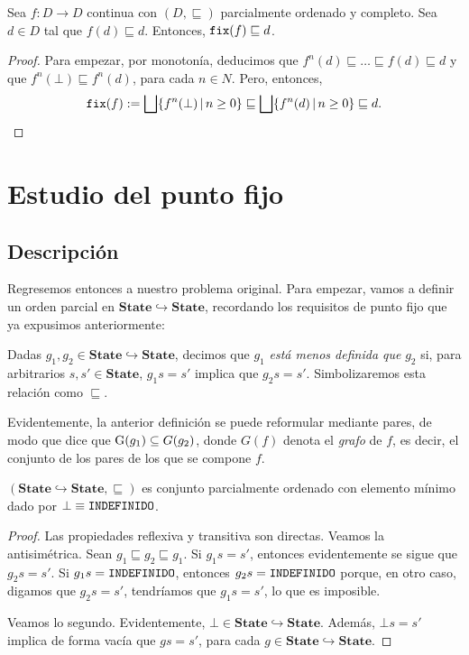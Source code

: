 \begin{prop}\label{propcpo}
Sea $f: D \to D$ continua con $(D, \sqsubseteq)$ parcialmente ordenado y completo. Sea $d \in D$ tal que $f(d)\sqsubseteq d$. Entonces, $\texttt{fix}(f) \sqsubseteq d$.
\end{prop}
\begin{proof}
Para empezar, por monotonía, deducimos que $f^n(d)\sqsubseteq \dots \sqsubseteq f(d) \sqsubseteq d$ y que $f^{n}(\bot) \sqsubseteq f^n(d)$, para cada $n \in N$. Pero, entonces, 
$$\texttt{fix}(f) := \bigsqcup\{f^n(\bot) \, | \, n \geq 0\} \sqsubseteq \bigsqcup\{f^n(d) \, | \, n \geq 0\} \sqsubseteq d.$$
\end{proof}


\section{Estudio del punto fijo}


\subsection{Descripción}

Regresemos entonces a nuestro problema original. Para empezar, vamos a definir un orden parcial en $\mathbf{State}\hookrightarrow \mathbf{State}$, recordando los requisitos de punto fijo que ya expusimos anteriormente:
\begin{definition}
Dadas $g_1, g_2 \in \mathbf{State}\hookrightarrow \mathbf{State}$, decimos que $g_1$ \textit{está menos definida que} $g_2$ si, para arbitrarios $s, s' \in \mathbf{State}$, $g_1 s = s'$ implica que $g_2 s = s'$. Simbolizaremos esta relación como $\sqsubseteq$. 
\end{definition}
Evidentemente, la anterior definición se puede reformular mediante pares, de modo que dice que $\mathrm{G}(g_1)\subseteq G(g_2)$, donde $G(f)$ denota el \textit{grafo} de $f$, es decir, el conjunto de los pares de los que se compone $f$.

\begin{lema}
$(\mathbf{State}\hookrightarrow \mathbf{State}, \sqsubseteq)$ es conjunto parcialmente ordenado con elemento mínimo dado por $\bot \equiv \texttt{INDEFINIDO}$.
\end{lema}
\begin{proof}
Las propiedades reflexiva y transitiva son directas. Veamos la antisimétrica. Sean $g_1 \sqsubseteq g_2 \sqsubseteq g_1$. Si $g_1s = s'$, entonces evidentemente se sigue que $g_2s = s'$. Si $g_1s = \texttt{INDEFINIDO}$, entonces $g_2s = \texttt{INDEFINIDO}$ porque, en otro caso, digamos que $g_2s = s'$, tendríamos que $g_1s=s'$, lo que es imposible.

Veamos lo segundo. Evidentemente, $\bot \in \mathbf{State}\hookrightarrow \mathbf{State}$. Además, $\bot s = s'$ implica de forma vacía que $gs = s'$, para cada $g \in \mathbf{State}\hookrightarrow \mathbf{State}$.
\end{proof}

